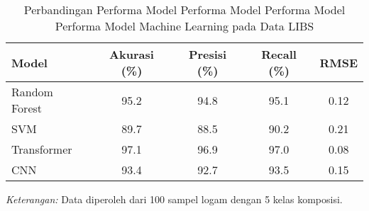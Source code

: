     \begin{table}[H]
        \centering
        \caption{Perbandingan Performa Model Performa Model Performa Model Performa Model Machine Learning pada Data LIBS}
        \label{tab:performa_ml}
        \centering
        \begin{tabular}{lcccc}
          \toprule
          Model & Akurasi (\%) & Presisi (\%) & Recall (\%) & RMSE \\
          \midrule
          Random Forest & 95.2 & 94.8 & 95.1 & 0.12 \\
          SVM & 89.7 & 88.5 & 90.2 & 0.21 \\
          Transformer & 97.1 & 96.9 & 97.0 & 0.08 \\
          CNN & 93.4 & 92.7 & 93.5 & 0.15 \\
          \bottomrule
        \end{tabular}
        
        \smallskip
        \footnotesize
        \textit{Keterangan:} Data diperoleh dari 100 sampel logam dengan 5 kelas komposisi.
      \end{table}
    

\begin{comment}

\end{comment}
